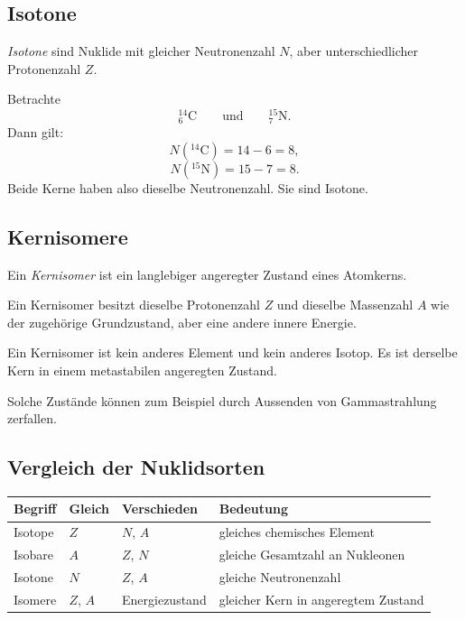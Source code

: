 \subsection{Isotone}

\begin{definitionbox}
\emph{Isotone} sind Nuklide mit gleicher Neutronenzahl $N$, aber unterschiedlicher
Protonenzahl $Z$.
\end{definitionbox}

\begin{examplebox}
Betrachte
\[
    {}^{14}_{6}\mathrm{C}
    \qquad\text{und}\qquad
    {}^{15}_{7}\mathrm{N}.
\]
Dann gilt:
\[
    N({}^{14}\mathrm{C})=14-6=8,
\]
\[
    N({}^{15}\mathrm{N})=15-7=8.
\]
Beide Kerne haben also dieselbe Neutronenzahl.
Sie sind Isotone.
\end{examplebox}

\subsection{Kernisomere}

\begin{definitionbox}
Ein \emph{Kernisomer} ist ein langlebiger angeregter Zustand eines Atomkerns.

Ein Kernisomer besitzt dieselbe Protonenzahl $Z$ und dieselbe Massenzahl $A$
wie der zugehörige Grundzustand, aber eine andere innere Energie.
\end{definitionbox}

\begin{conceptbox}
Ein Kernisomer ist kein anderes Element und kein anderes Isotop.
Es ist derselbe Kern in einem metastabilen angeregten Zustand.

Solche Zustände können zum Beispiel durch Aussenden von Gammastrahlung zerfallen.
\end{conceptbox}

\subsection{Vergleich der Nuklidsorten}

\begin{center}
\begin{tabular}{|l|l|l|p{6.4cm}|}
\hline
Begriff & Gleich & Verschieden & Bedeutung \\
\hline
Isotope & $Z$ & $N$, $A$ & gleiches chemisches Element \\
\hline
Isobare & $A$ & $Z$, $N$ & gleiche Gesamtzahl an Nukleonen \\
\hline
Isotone & $N$ & $Z$, $A$ & gleiche Neutronenzahl \\
\hline
Isomere & $Z$, $A$ & Energiezustand & gleicher Kern in angeregtem Zustand \\
\hline
\end{tabular}
\end{center}

